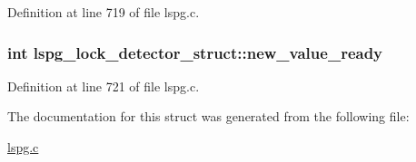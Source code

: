 Definition at line 719 of file lspg.c.\hypertarget{structlspg__lock__detector__struct_a62373414b815fe178edd8522b3bd4d78}{
\subsubsection[{new\_\-value\_\-ready}]{\setlength{\rightskip}{0pt plus 5cm}int {\bf lspg\_\-lock\_\-detector\_\-struct::new\_\-value\_\-ready}}}
\label{structlspg__lock__detector__struct_a62373414b815fe178edd8522b3bd4d78}


Definition at line 721 of file lspg.c.

The documentation for this struct was generated from the following file:\begin{DoxyCompactItemize}
\item 
\hyperlink{lspg_8c}{lspg.c}\end{DoxyCompactItemize}
